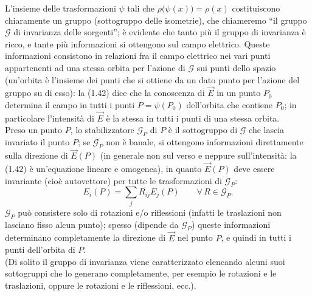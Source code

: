 L'insieme delle trasformazioni $\psi$ tali che $\rho\big(\psi(x)\big)=\rho(x)$ costituiscono chiaramente un gruppo (sottogruppo delle isometrie), che chiameremo ``il gruppo $\mathcal G$ di invarianza delle sorgenti''; è evidente che tanto più il gruppo di invarianza è ricco, e tante più informazioni si ottengono sul campo elettrico. Queste informazioni consistono in relazioni fra il campo elettrico nei vari punti appartenenti ad una stessa orbita per l'azione di $\mathcal G$ sui punti dello spazio (un'orbita è l'insieme dei punti che si ottiene da un dato punto per l'azione del gruppo su di esso): la (1.42) dice che la conoscenza di $\vec E$ in un punto $P_0$ determina il campo in tutti i punti $P=\psi(P_0)$ dell'orbita che contiene $P_0$; in particolare l'intensità di $\vec E$ è la stessa in tutti i punti di una stessa orbita.\\
Preso un punto $P$, lo stabilizzatore $\mathcal G_P$ di $P$ è il sottogruppo di $\mathcal G$ che lascia invariato il punto $P$; se $\mathcal G_P$ non è banale, si ottengono informazioni direttamente sulla direzione di $\vec E(P)$ (in generale non sul verso e neppure sull'intensità: la (1.42) è un'equazione lineare e omogenea), in quanto $\vec E(P)$ deve essere invariante (cioè autovettore) per tutte le trasformazioni di $\mathcal G_P$:
\begin{equation}
E_i(P)=\textstyle\sum_jR_{ij}E_j(P)\qquad\forall\,R\in\mathcal G_P.
\tag{1.43}
\end{equation}
$\mathcal G_P$ può consistere solo di rotazioni e/o riflessioni (infatti le traslazioni non lasciano fisso alcun punto); spesso (dipende da $\mathcal G_P$) queste informazioni determinano completamente la direzione di $\vec E$ nel punto $P$, e quindi in tutti i punti dell'orbita di $P$.\\
(Di solito il gruppo di invarianza viene caratterizzato elencando alcuni suoi sottogruppi che lo generano completamente, per esempio le rotazioni e le traslazioni, oppure le rotazioni e le riflessioni, ecc.).

